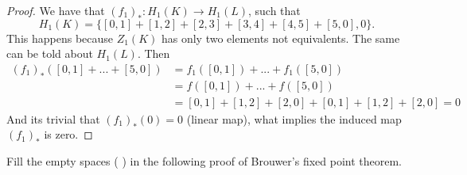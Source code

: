 \begin{proof}
    We have that $(f_1)_* : H_1(K) \to H_1(L)$, such that $$H_1(K) = \{[0,1] +
    [1,2]+ [2,3] + [3,4] + [4,5] + [5,0], 0\}.$$
    This happens because $Z_1(K)$ has only two elements not equivalents. The
    same can be told about $H_1(L)$. Then 
    \begin{equation*}
        \begin{split}
            (f_1)_*([0,1] + ... + [5,0]) &= f_1([0,1]) + ... + f_1([5,0]) \\
            &= f([0,1]) + ... + f([5,0]) \\
            &= [0,1] + [1,2] + [2,0] + [0,1] + [1,2] + [2,0] = 0
        \end{split}
    \end{equation*}
    And its trivial that $(f_1)_*(0) = 0$ (linear map), what implies the induced map $(f_1)_*$ is zero.
\end{proof}

\noindent\linia

\begin{exercise}
    Fill the empty spaces ( ) in the following proof of Brouwer’s fixed point theorem.
\end{exercise}

